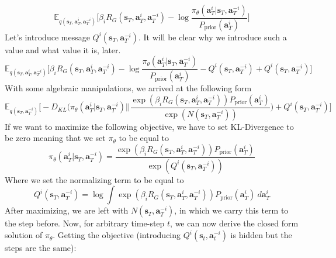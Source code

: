 \begin{equation}
    \mathbb{E}_{q(\boldsymbol{s}_{T}, \boldsymbol{a}^i_{T}, \boldsymbol{a}^{-i}_{T})} \Bigg[\beta_i R_G(\boldsymbol{s}_{T}, \boldsymbol{a}^i_{T}, \boldsymbol{a}^{-i}_{T}) - \log \frac{\pi_{\theta}(\boldsymbol{a}^i_T | \boldsymbol{s}_T, \boldsymbol{a}^{-i}_T)}{P_{\text{prior}}(\boldsymbol{a}^i_T)}\Bigg]
\end{equation}
Let's introduce message $Q^{i}(\boldsymbol{s}_T, \boldsymbol{a}^{-i}_T)$. It will be clear why we introduce such a value and what value it is, later. 
\begin{equation}
    \mathbb{E}_{q(\boldsymbol{s}_{T}, \boldsymbol{a}^i_{T}, \boldsymbol{a}^{-i}_{T})} \Bigg[\beta_i R_G(\boldsymbol{s}_{T}, \boldsymbol{a}^i_{T}, \boldsymbol{a}^{-i}_{T}) - \log \frac{\pi_{\theta}(\boldsymbol{a}^i_T | \boldsymbol{s}_T, \boldsymbol{a}^{-i}_T)}{P_{\text{prior}}(\boldsymbol{a}^i_T)} - Q^{i}(\boldsymbol{s}_T, \boldsymbol{a}^{-i}_T) + Q^{i}(\boldsymbol{s}_T, \boldsymbol{a}^{-i}_T)\Bigg]
\end{equation}
With some algebraic manipulations, we arrived at the following form 
\begin{equation}
    \mathbb{E}_{q(\boldsymbol{s}_{T}, \boldsymbol{a}^{-i}_{T})} \Bigg[ -D_{KL} \Bigg( \pi_{\theta}(\boldsymbol{a}^i_T | \boldsymbol{s}_T, \boldsymbol{a}_T^{-i}) \Bigg|\Bigg| \frac{\exp(\beta_i R_G(\boldsymbol{s}_{T}, \boldsymbol{a}^i_{T}, \boldsymbol{a}^{-i}_{T})) P_{\text{prior}}(\boldsymbol{a}^i_T)}{\exp(N(\boldsymbol{s}_T, \boldsymbol{a}^{-i}_T))} \Bigg) + Q^{i}(\boldsymbol{s}_T, \boldsymbol{a}^{-i}_T) \Bigg]
\end{equation}
If we want to maximize the following objective, we have to set KL-Divergence to be zero meaning that we set $\pi_{\theta}$ to be equal to 
\begin{equation}
    \pi_{\theta}(\boldsymbol{a}^i_T | \boldsymbol{s}_T, \boldsymbol{a}_T^{-i}) = \frac{\exp(\beta_i R_G(\boldsymbol{s}_{T}, \boldsymbol{a}^i_{T}, \boldsymbol{a}^{-i}_{T})) P_{\text{prior}}(\boldsymbol{a}^i_T)}{\exp(Q^{i}(\boldsymbol{s}_T, \boldsymbol{a}^{-i}_T))}
\end{equation}
Where we set the normalizing term to be equal to 
\begin{equation}
    Q^{i}(\boldsymbol{s}_T, \boldsymbol{a}^{-i}_T) = \log \int \exp(\beta_i R_G(\boldsymbol{s}_{T}, \boldsymbol{a}^i_{T}, \boldsymbol{a}^{-i}_{T})) P_{\text{prior}}(\boldsymbol{a}^i_T) \ d \boldsymbol{a}^i_T
\end{equation}
After maximizing, we are left with $N(\boldsymbol{s}_T, \boldsymbol{a}^{-i}_T)$, in which we carry this term to the step before. Now, for arbitrary time-step $t$, we can now derive the closed form solution of $\pi_{\theta}$. Getting the objective (introducing $Q^{i}(\boldsymbol{s}_t, \boldsymbol{a}^{-i}_t)$ is hidden but the steps are the same):
